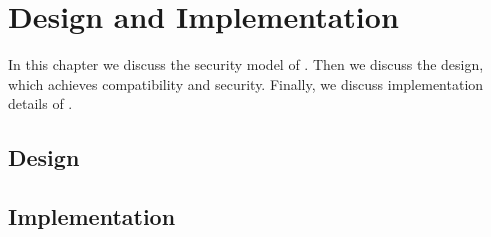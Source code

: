 \chapter{Design and Implementation}
\label{sec:design_implementation}

In this chapter we discuss the security model of . Then we discuss the  design, which achieves compatibility and security. Finally, we discuss implementation details of .



\section{Design}





\section{Implementation}







